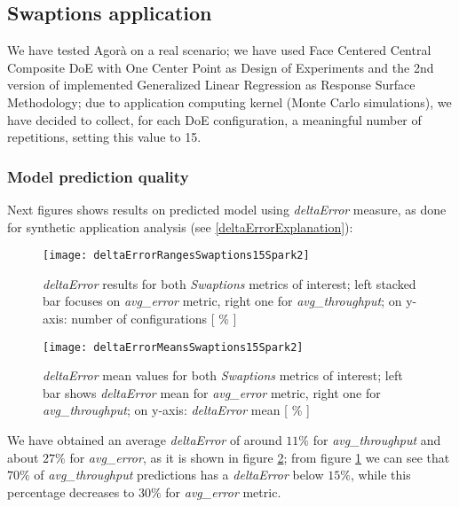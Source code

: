\subsection{Swaptions application}

We have tested Agorà on a real scenario; we have used Face Centered Central Composite DoE with One Center Point as Design of Experiments and the 2nd version of implemented Generalized Linear Regression as Response Surface Methodology; due to application computing kernel (Monte Carlo simulations), we have decided to collect, for each DoE configuration, a meaningful number of repetitions, setting this value to 15.


\subsubsection{Model prediction quality}

Next figures shows results on predicted model using \textit{deltaError} measure, as done for synthetic application analysis (see \ref{deltaErrorExplanation}):





\begin{figure}[H]

    \centering
    \texttt{[image: deltaErrorRangesSwaptions15Spark2]}
    \caption{\textit{deltaError} results for both \textit{Swaptions} metrics of interest; left stacked bar focuses on \textit{avg\_error} metric, right one for \textit{avg\_throughput}; on y-axis: number of configurations [ \% ]}
    \label{fig::swaptions15spark2::intervals}
    
\end{figure}

\begin{figure}[H]

    \centering
    \texttt{[image: deltaErrorMeansSwaptions15Spark2]}
    \caption{\textit{deltaError} mean values for both \textit{Swaptions} metrics of interest; left bar shows \textit{deltaError} mean for \textit{avg\_error} metric, right one for \textit{avg\_throughput}; on y-axis: \textit{deltaError} mean [ \% ]}
    \label{fig::swaptions15spark2::means}
    
\end{figure}





We have obtained an average \textit{deltaError} of around $11\%$ for \textit{avg\_throughput} and about $27\%$ for \textit{avg\_error}, as it is shown in figure \ref{fig::swaptions15spark2::means}; from figure \ref{fig::swaptions15spark2::intervals} we can see that $70\%$ of \textit{avg\_throughput} predictions has a \textit{deltaError} below $15\%$, while this percentage decreases to $30\%$ for \textit{avg\_error} metric.


